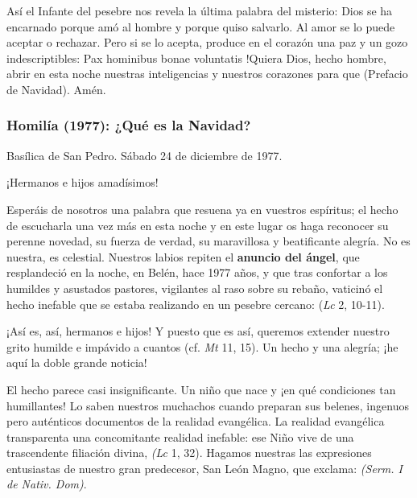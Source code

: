\begin{body}
\begin{body}
Así el Infante del pesebre nos revela la última palabra del misterio: Dios se ha encarnado porque amó al hombre y porque quiso salvarlo. Al amor se lo puede aceptar o rechazar. Pero si se lo acepta, produce en el corazón una paz y un gozo indescriptibles: Pax hominibus bonae voluntatis !Quiera Dios, hecho hombre, abrir en esta noche nuestras inteligencias y nuestros corazones para que  (Prefacio de Navidad). Amén.

\subsubsection{Homilía (1977): ¿Qué es la Navidad?}

Basílica de San Pedro. Sábado 24 de diciembre de 1977.

¡Hermanos e hijos amadísimos!

Esperáis de nosotros una palabra que resuena ya en vuestros espíritus; el hecho de escucharla una vez más en esta noche y en este lugar os haga reconocer su perenne novedad, su fuerza de verdad, su maravillosa y beatificante alegría. No es nuestra, es celestial. Nuestros labios repiten el \textbf{anuncio del ángel}, que resplandeció en la noche, en Belén, hace 1977 años, y que tras confortar a los humildes y asustados pastores, vigilantes al raso sobre su rebaño, vaticinó el hecho inefable que se estaba realizando en un pesebre cercano:  (\emph{Lc} 2, 10-11).

¡Así es, así, hermanos e hijos! Y puesto que es así, queremos extender nuestro grito humilde e impávido a cuantos  (cf. \emph{Mt} 11, 15). Un hecho y una alegría; ¡he aquí la doble grande noticia!

El hecho parece casi insignificante. Un niño que nace y ¡en qué condiciones tan humillantes! Lo saben nuestros muchachos cuando preparan sus belenes, ingenuos pero auténticos documentos de la realidad evangélica. La realidad evangélica transparenta una concomitante realidad inefable: ese Niño vive de una trascendente filiación divina,  \emph{(Lc} 1, 32). Hagamos nuestras las expresiones entusiastas de nuestro gran predecesor, San León Magno, que exclama:  \emph{(Serm. I de Nativ. Dom)}.


\end{body}
\end{body}
